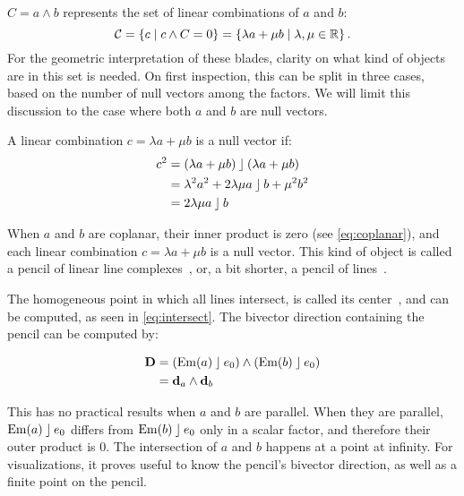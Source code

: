 $C = a \wedge b$ represents the set of linear combinations of $a$ and $b$:
\begin{equation*}
  \mathcal{C} = \left\{ c \mid c \wedge C = 0 \right\} = \left\{ \lambda a + \mu b \mid \lambda, \mu \in \mathbb{R} \right\} .
\end{equation*}
For the geometric interpretation of these blades, clarity on what kind of objects are in this set is needed.  On first inspection, this can be split in three cases, based on the number of null vectors among the factors.  We will limit this discussion to the case where both $a$ and $b$ are null vectors.

A linear combination $c = \lambda a + \mu b$ is a null vector if:
\begin{align}
  \label{eq:lincombnull}
  c^2 &= (\lambda a + \mu b) \mathbin{\rfloor} (\lambda a + \mu b) \nonumber \\
  &= \lambda^2 a^2 + 2 \lambda \mu a \mathbin{\rfloor} b + \mu^2 b^2 \nonumber \\
  &= 2 \lambda \mu a \mathbin{\rfloor} b
\end{align}

When $a$ and $b$ are coplanar, their inner product is zero (see \autoref{eq:coplanar}), and each linear combination $c = \lambda a + \mu b$ is a null vector.  This kind of object is called a pencil of linear line complexes~\cite[Section 3.2.1]{Pottmann}, or, a bit shorter, a pencil of lines~\cite{Hongbo}.

The homogeneous point in which all lines intersect, is called its center~\cite{Hongbo}, and can be computed, as seen in \autoref{eq:intersect}.  The bivector direction containing the pencil can be computed by:

\begin{align*}
  \mathbf{D} &= \left(\operatorname{Em}(a) \mathbin{\rfloor} e_0 \right) \wedge \left(\operatorname{Em}(b) \mathbin{\rfloor} e_0\right) \\
  &= \mathbf{d}_a \wedge \mathbf{d}_b 
\end{align*}

This has no practical results when $a$ and $b$ are parallel.  When they are parallel, $\operatorname{Em}(a) \mathbin{\rfloor} e_0$ differs from $\operatorname{Em}(b) \mathbin{\rfloor} e_0$ only in a scalar factor, and therefore their outer product is $0$.  The intersection of $a$ and $b$ happens at a point at infinity.  For visualizations, it proves useful to know the pencil's bivector direction, as well as a finite point on the pencil.  

